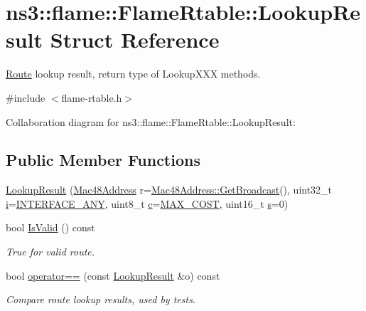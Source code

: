 \hypertarget{structns3_1_1flame_1_1FlameRtable_1_1LookupResult}{}\section{ns3\+:\+:flame\+:\+:Flame\+Rtable\+:\+:Lookup\+Result Struct Reference}
\label{structns3_1_1flame_1_1FlameRtable_1_1LookupResult}


\hyperlink{structns3_1_1flame_1_1FlameRtable_1_1Route}{Route} lookup result, return type of Lookup\+X\+XX methods.  




{\ttfamily \#include $<$flame-\/rtable.\+h$>$}



Collaboration diagram for ns3\+:\+:flame\+:\+:Flame\+Rtable\+:\+:Lookup\+Result\+:
\subsection*{Public Member Functions}
\begin{DoxyCompactItemize}
\item 
\hyperlink{structns3_1_1flame_1_1FlameRtable_1_1LookupResult_abbc4b1cb7a187c7d6d1f0e40eef25313}{Lookup\+Result} (\hyperlink{classns3_1_1Mac48Address}{Mac48\+Address} r=\hyperlink{classns3_1_1Mac48Address_a55156e302c6bf950c0b558365adbde84}{Mac48\+Address\+::\+Get\+Broadcast}(), uint32\+\_\+t \hyperlink{lte__uplink__power__control_8m_a6f6ccfcf58b31cb6412107d9d5281426}{i}=\hyperlink{classns3_1_1flame_1_1FlameRtable_a355b8bbdfec725bb9ccfddc8f3302573}{I\+N\+T\+E\+R\+F\+A\+C\+E\+\_\+\+A\+NY}, uint8\+\_\+t \hyperlink{mmwave_2model_2fading-traces_2fading__trace__generator_8m_ae0323a9039add2978bf5b49550572c7c}{c}=\hyperlink{classns3_1_1flame_1_1FlameRtable_abc65618c03b34257555012ddab0bbf36}{M\+A\+X\+\_\+\+C\+O\+ST}, uint16\+\_\+t \hyperlink{generate__test__data__lte__sinr_8m_ad83eeb3a142285d1243a08c6b7026df8}{s}=0)
\item 
bool \hyperlink{structns3_1_1flame_1_1FlameRtable_1_1LookupResult_a23b391c5f245683d12a244d9f704b779}{Is\+Valid} () const 
\begin{DoxyCompactList}\small\item\em True for valid route. \end{DoxyCompactList}\item 
bool \hyperlink{structns3_1_1flame_1_1FlameRtable_1_1LookupResult_aa3d04fd43b181a30a3b927fe03e94aa8}{operator==} (const \hyperlink{structns3_1_1flame_1_1FlameRtable_1_1LookupResult}{Lookup\+Result} \&o) const 
\begin{DoxyCompactList}\small\item\em Compare route lookup results, used by tests. \end{DoxyCompactList}\end{DoxyCompactItemize}
